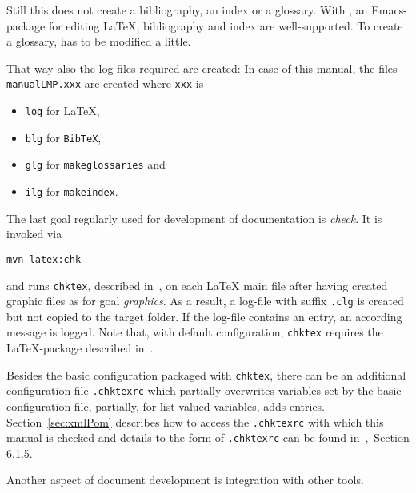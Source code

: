 Still this does not create a bibliography, an index or a glossary. 
With \auctex{}, an Emacs-package for editing \LaTeX, 
bibliography and index are well-supported. 
To create a glossary, \auctex{} has to be modified a little. 


That way also the log-files required are created: 
In case of this manual, 
the files \texttt{manualLMP.xxx} are created 
where \texttt{xxx} is 
%
\begin{itemize}
\item
\texttt{log} for \LaTeX, 
\item
\texttt{blg} for \texttt{BibTeX}, 
\item
\texttt{glg} for \texttt{makeglossaries} and 
\item
\texttt{ilg} for \texttt{makeindex}. 
\end{itemize}

The last goal regularly used for development of documentation is \emph{check}. 
It is invoked via 
% 
\begin{Verbatim}
mvn latex:chk
\end{Verbatim}
%
and runs \texttt{chktex}, described in~\cite{ChkTeX22}, 
on each \LaTeX{} main file 
after having created graphic files as for goal \emph{graphics}. 
As a result, a log-file with suffix \texttt{.clg} is created 
but not copied to the target folder. 
If the log-file contains an entry, 
an according message is logged. 
Note that, with default configuration, 
\texttt{chktex} requires the \LaTeX-package  
described in~\cite{BooktP}. 

Besides the basic configuration packaged with \texttt{chktex}, 
there can be an additional configuration file \texttt{.chktexrc} 
which partially overwrites variables set by the basic configuration file, 
partially, for list-valued variables, adds entries. 
Section~\ref{sec:xmlPom} describes how to access the \texttt{.chktexrc} 
with which this manual is checked and 
details to the form of \texttt{.chktexrc} can be found in~\cite{ChkTeX22},~Section 6.1.5.  





Another aspect of document development is integration with other tools. 

